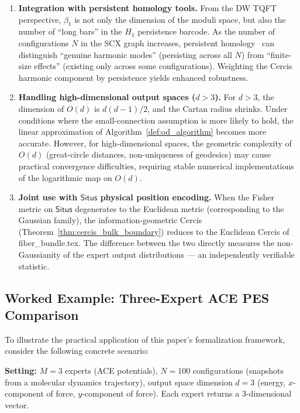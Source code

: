 \documentclass[12pt,a4paper]{article}
\theoremstyle{definition}
\theoremstyle{remark}
\theoremstyle{definition}
\newcommand{\Od}{O(d)}
\newcommand{\Situs}{\textsf{Situs}}
\newcommand{\ZBetti}{\beta_1}
\begin{document}
\begin{enumerate}[label=(\arabic*)]
    \item \textbf{Integration with persistent homology tools.}
    From the DW TQFT perspective, $\ZBetti$ is not only the dimension of the moduli space, but also the number of ``long bars'' in the $H_1$ persistence barcode.
    As the number of configurations $N$ in the SCX graph increases, persistent homology~\cite{edelsbrunner2008}
    can distinguish ``genuine harmonic modes'' (persisting across all $N$) from ``finite-size effects'' (existing only across some configurations).
    Weighting the Cercis harmonic component by persistence yields enhanced robustness.

    \item \textbf{Handling high-dimensional output spaces ($d > 3$).}
    For $d > 3$, the dimension of $\Od$ is $d(d-1)/2$, and the Cartan radius shrinks.
    Under conditions where the small-connection assumption is more likely to hold, the linear approximation of Algorithm~\ref{def:od_algorithm} becomes more accurate.
    However, for high-dimensional spaces, the geometric complexity of $\Od$ (great-circle distances, non-uniqueness of geodesics)
    may cause practical convergence difficulties, requiring stable numerical implementations of the logarithmic map on $\Od$.

    \item \textbf{Joint use with $\Situs$ physical position encoding.}
    When the Fisher metric on $\Situs$ degenerates to the Euclidean metric (corresponding to the Gaussian family),
    the information-geometric Cercis (Theorem~\ref{thm:cercis_bulk_boundary}) reduces to the Euclidean Cercis of fiber\_bundle.tex.
    The difference between the two directly measures the non-Gaussianity of the expert output distributions —
    an independently verifiable statistic.
\end{enumerate}

\subsection{Worked Example: Three-Expert ACE PES Comparison}

To illustrate the practical application of this paper's formalization framework, consider the following concrete scenario:

\textbf{Setting:} $M=3$ experts (ACE potentials), $N=100$ configurations (snapshots from a molecular dynamics trajectory),
output space dimension $d=3$ (energy, $x$-component of force, $y$-component of force). Each expert returns a 3-dimensional vector.
\end{document}

